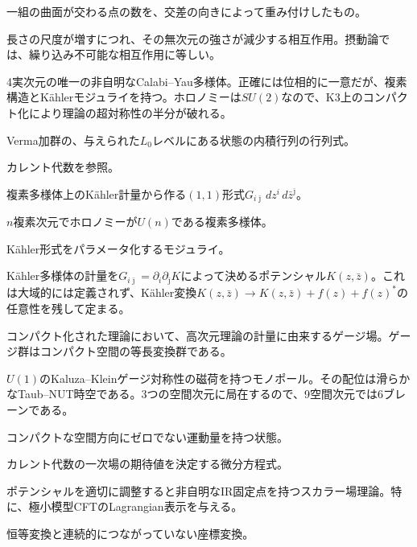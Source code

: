 {一組の曲面が交わる点の数を、交差の向きによって重み付けしたもの。}

{長さの尺度が増すにつれ、その無次元の強さが減少する相互作用。摂動論では、繰り込み不可能な相互作用に等しい。}

{4実次元の唯一の非自明なCalabi--Yau多様体。正確には位相的に一意だが、複素構造とKählerモジュライを持つ。ホロノミーは$SU(2)$なので、K3上のコンパクト化により理論の超対称性の半分が破れる。}

{Verma加群の、与えられた$L_0$レベルにある状態の内積行列の行列式。}

{カレント代数を参照。}

{複素多様体上のKähler計量から作る$(1,1)$形式$G_{i\bar\jmath}\,dz^i\,d\bar z^{\bar\jmath}$。}

{$n$複素次元でホロノミーが$U(n)$である複素多様体。}

{Kähler形式をパラメータ化するモジュライ。}

{Kähler多様体の計量を$G_{i\bar\jmath}=\partial_i\partial_{\bar\jmath}K$によって決めるポテンシャル$K(z,\bar z)$。これは大域的には定義されず、Kähler変換$K(z,\bar z)\to K(z,\bar z)+f(z)+f(z)^*$の任意性を残して定まる。}

{コンパクト化された理論において、高次元理論の計量に由来するゲージ場。ゲージ群はコンパクト空間の等長変換群である。}

{$U(1)$のKaluza--Kleinゲージ対称性の磁荷を持つモノポール。その配位は滑らかなTaub--NUT時空である。3つの空間次元に局在するので、9空間次元では6ブレーンである。}

{コンパクトな空間方向にゼロでない運動量を持つ状態。}

{カレント代数の一次場の期待値を決定する微分方程式。}

{ポテンシャルを適切に調整すると非自明なIR固定点を持つスカラー場理論。特に、極小模型CFTのLagrangian表示を与える。}

{恒等変換と連続的につながっていない座標変換。}

